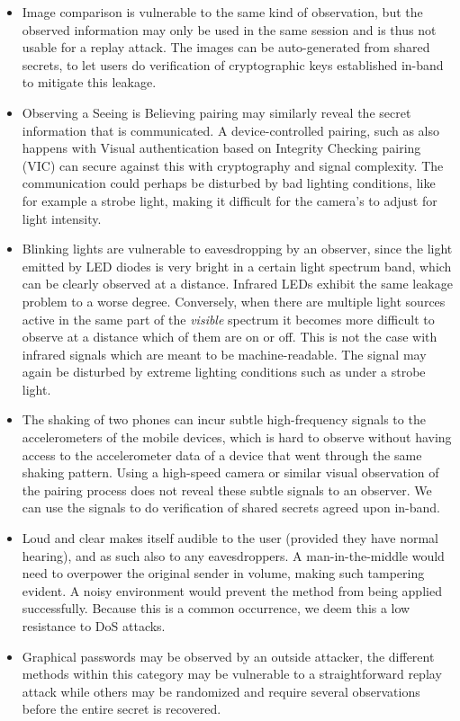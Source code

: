 \documentclass[conference, 11pt]{sty/IEEEtran}
\begin{document}
\begin{itemize}
	\item Image comparison is vulnerable to the same kind of observation, but the observed information may only be used in the same session and is thus not usable for a replay attack.
	The images can be auto-generated from shared secrets, to let users do verification of cryptographic keys established in-band to mitigate this leakage.
	\item Observing a Seeing is Believing pairing may similarly reveal the secret information that is communicated. A device-controlled pairing, such as also happens with Visual authentication based on Integrity Checking pairing (VIC) can secure against this with cryptography and signal complexity.
	The communication could perhaps be disturbed by bad lighting conditions, like for example a strobe light, making it difficult for the camera's to adjust for light intensity.
	\item Blinking lights are vulnerable to eavesdropping by an observer, since the light emitted by LED diodes is very bright in a certain light spectrum band, which can be clearly observed at a distance.
	Infrared LEDs exhibit the same leakage problem to a worse degree.
	Conversely, when there are multiple light sources active in the same part of the \textit{visible} spectrum it becomes more difficult to observe at a distance which of them are on or off. This is not the case with infrared signals which are meant to be machine-readable.
	The signal may again be disturbed by extreme lighting conditions such as under a strobe light.
	\item The shaking of two phones can incur subtle high-frequency signals to the accelerometers of the mobile devices, which is hard to observe without having access to the accelerometer data of a device that went through the same shaking pattern.
	Using a high-speed camera or similar visual observation of the pairing process does not reveal these subtle signals to an observer.
	We can use the signals to do verification of shared secrets agreed upon in-band.
	\item Loud and clear makes itself audible to the user (provided they have normal hearing), and as such also to any eavesdroppers. A man-in-the-middle would need to overpower the original sender in volume, making such tampering evident. A noisy environment would prevent the method from being applied successfully. Because this is a common occurrence, we deem this a low resistance to DoS attacks.
	\item Graphical passwords may be observed by an outside attacker, the different methods within this category may be vulnerable to a straightforward replay attack while others may be randomized and require several observations before the entire secret is recovered.

\end{itemize}
\end{document}
